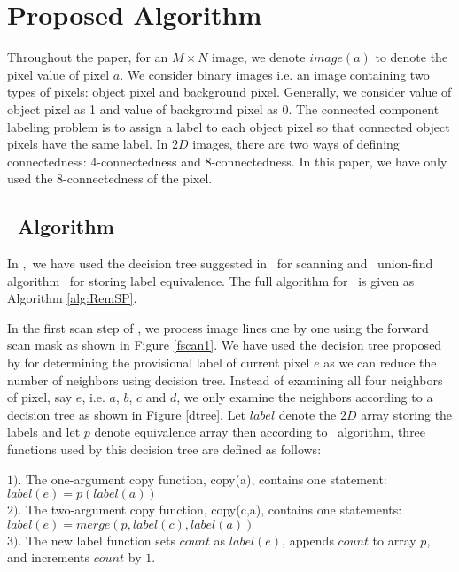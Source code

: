 \vspace{\sectionSpace}
\section{Proposed Algorithm}
\label{sec:proposed_algorithm}

Throughout the paper, for an $M \times N$ image, we denote $image(a)$ to denote the pixel value of pixel $a$.
We consider binary images i.e. an image containing two types of pixels:
object pixel and background pixel. Generally, we consider value of object pixel as 1 and value of background pixel as 0. The connected
component labeling problem is to assign a label to each object pixel so that connected object pixels have the same label.
In $2D$ images, there are two ways of defining connectedness: $4$-connectedness and $8$-connectedness. In this paper, we have 
only used the $8$-connectedness of the pixel.


\vspace{\sectionSpace}
\subsection{\nremsp\ Algorithm}

In \nremsp,\ we have used the decision tree suggested in \lrpc\ 
for scanning and \rems\ union-find algorithm \remsp\ for storing label
equivalence.
The full algorithm for \nremsp\ is given as Algorithm \ref{alg:RemSP}.



In the first scan step of \nremsp, we process image lines one by one using the
forward scan mask as shown in Figure \ref{fscan1}. We have used the decision tree proposed by \cite{Wu2009_LRPC} for 
determining the provisional label of current pixel $e$ as we can reduce the number of neighbors using decision tree. Instead of
examining all four neighbors of pixel, say $e$, i.e. $a$, $b$, $c$ and $d$, we only
examine the neighbors according to a decision tree as shown in Figure
\ref{dtree}.
 Let $label$ denote the $2D$ array storing the labels and let $p$ denote equivalence array 
 then according to \lrpc\ algorithm,
three functions used by this decision tree are defined as follows:

$1)$. The one-argument copy function, copy(a), contains one statement:
					$label(e) = p(label(a))$\\
$2)$. The two-argument copy function, copy(c,a), contains one statements:
				$label(e) = merge(p, label(c), label(a))$\\
$3)$. The new label function sets $count$ as $label(e)$, appends $count$ to array $p$, and increments $count$ by $1$.

